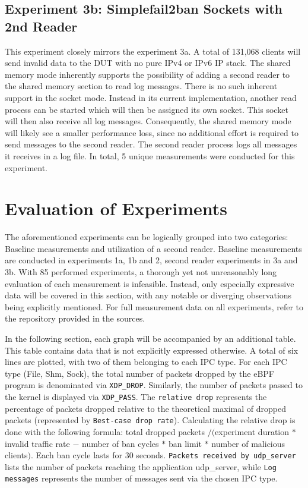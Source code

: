 \subsection{Experiment 3b: Simplefail2ban Sockets with 2nd Reader}
This experiment closely mirrors the experiment 3a.
A total of 131,068 clients will send invalid data to the \ac{DUT} with no pure IPv4 or IPv6 \ac{IP} stack.
The shared memory mode inherently supports the possibility of adding a second reader to the shared memory section to read log messages.
There is no such inherent support in the socket mode.
Instead in its current implementation, another read process can be started which will then be assigned its own socket.
This socket will then also receive all log messages.
Consequently, the shared memory mode will likely see a smaller performance loss, since no additional effort is required to send messages to the second reader. 
The second reader process logs all messages it receives in a log file.
In total, 5 unique measurements were conducted for this experiment.

\newpage
\section{Evaluation of Experiments}
The aforementioned experiments can be logically grouped into two categories\@: Baseline measurements and utilization of a second reader.
Baseline measurements are conducted in experiments 1a, 1b and 2, second reader experiments in 3a and 3b.
With 85 performed experiments, a thorough yet not unreasonably long evaluation of each measurement is infeasible.
Instead, only especially expressive data will be covered in this section, with any notable or diverging observations being explicitly mentioned.
For full measurement data on all experiments, refer to the repository provided in the sources\cite{git:repoOfThesis}.

In the following section, each graph will be accompanied by an additional table.
This table contains data that is not explicitly expressed otherwise.
A total of six lines are plotted, with two of them belonging to each \ac{IPC} type.
For each \ac{IPC} type (File, Shm, Sock), the total number of packets dropped by the \ac{eBPF} program is denominated via \texttt{XDP\_DROP}.
Similarly, the number of packets passed to the kernel is displayed via \texttt{XDP\_PASS}.
The \texttt{relative drop} represents the percentage of packets dropped relative to the theoretical maximal of dropped packets (represented by \texttt{Best-case drop rate}).
Calculating the relative drop is done with the following formula:
total dropped packets $/ ($experiment duration $*$ invalid traffic rate $-$ number of ban cycles $*$ ban limit $*$ number of malicious clients$)$.
Each ban cycle lasts for 30 seconds.
\texttt{Packets received by udp\_server} lists the number of packets reaching the application udp\_server, while \texttt{Log messages} represents the number of messages sent via the chosen \ac{IPC} type.

